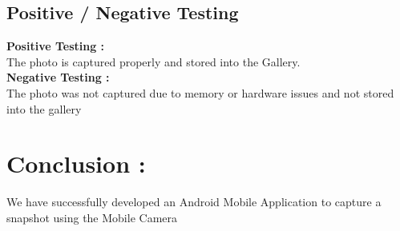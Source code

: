 \documentclass{article}
\begin{document}
\subsection {Positive / Negative Testing}

\textbf{Positive Testing :}\\
The photo is captured properly and stored into the Gallery.\\

\textbf{Negative Testing :}\\
The photo was not captured due to memory or hardware issues and not stored into the gallery

\section{Conclusion : }

We have successfully developed an Android Mobile Application to capture a snapshot using the Mobile Camera
\end{document}
